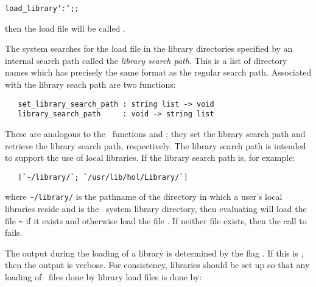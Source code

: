 \begin{hol}\begin{alltt}
   load_library `:`;;
\end{alltt}\end{hol}

\noindent then the load file will be called .  

The%
%
system searches for the load file in the library directories specified by an
internal search path called the {\it library search path}.  This is a list of
directory names which has precisely the same format as the regular search path.
Associated with the library seach path are two functions:

\begin{boxed}
\begin{verbatim}
   set_library_search_path : string list -> void
   library_search_path     : void -> string list
\end{verbatim}\end{boxed}

\noindent These are analogous to the \ML\ functions  and
; they set the library search path and retrieve the
library search path, respectively.  The library search path is intended to
support the use of local libraries. If the library search path is, for example:

\begin{hol}\begin{verbatim}
   [`~/library/`; `/usr/lib/hol/Library/`]
\end{verbatim}\end{hol}

\noindent where {\small\verb!~/library/!} is the pathname of the directory in
which a user's local libraries reside and  is the
\HOL\ system library directory, then evaluating 
will load the file {\small\verb!~!} if it
exists and otherwise load the file . If
neither file exists, then the call to 
fails.%

The output during the loading of a library is determined by the flag
. If this is , then
the output is verbose. For consistency, libraries should be set up so that any
loading of \ML\ files done by library load files is done by:

